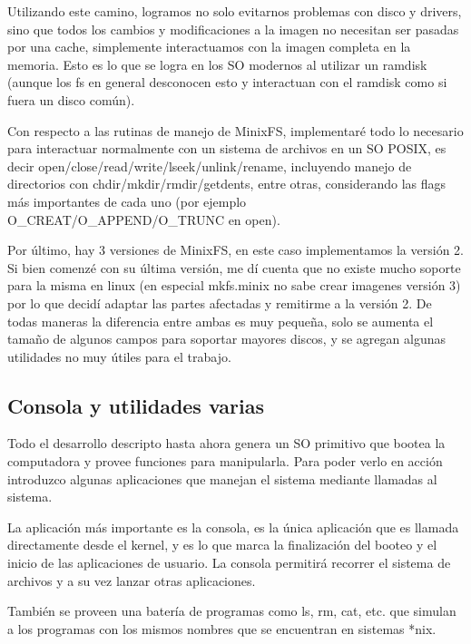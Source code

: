 Utilizando este camino, logramos no solo evitarnos problemas con disco y
drivers, sino que todos los cambios y modificaciones a la imagen no necesitan
ser pasadas por una cache, simplemente interactuamos con la imagen completa en
la memoria. Esto es lo que se logra en los SO modernos al utilizar un ramdisk
(aunque los fs en general desconocen esto y interactuan con el ramdisk como si
fuera un disco común).

Con respecto a las rutinas de manejo de MinixFS, implementaré todo lo necesario
para interactuar normalmente con un sistema de archivos en un SO POSIX, es decir
open/close/read/write/lseek/unlink/rename, incluyendo manejo de directorios con
chdir/mkdir/rmdir/getdents, entre otras, considerando las flags más importantes
de cada uno (por ejemplo O\_CREAT/O\_APPEND/O\_TRUNC en open).

Por último, hay 3 versiones de MinixFS, en este caso implementamos la versión 2.
Si bien comenzé con su última versión, me dí cuenta que no existe mucho
soporte para la misma en linux (en especial mkfs.minix no sabe crear imagenes
versión 3) por lo que decidí adaptar las partes afectadas y remitirme a la
versión 2. De todas maneras la diferencia entre ambas es muy pequeña, solo se
aumenta el tamaño de algunos campos para soportar mayores discos, y se agregan
algunas utilidades no muy útiles para el trabajo.

\subsection{Consola y utilidades varias}

Todo el desarrollo descripto hasta ahora genera un SO primitivo que bootea la
computadora y provee funciones para manipularla. Para poder verlo en acción
introduzco algunas aplicaciones que manejan el sistema mediante llamadas al
sistema.

La aplicación más importante es la consola, es la única aplicación que es
llamada directamente desde el kernel, y es lo que marca la finalización del
booteo y el inicio de las aplicaciones de usuario. La consola permitirá recorrer
el sistema de archivos y a su vez lanzar otras aplicaciones.

También se proveen una batería de programas como ls, rm, cat, etc. que simulan a
los programas con los mismos nombres que se encuentran en sistemas *nix.
